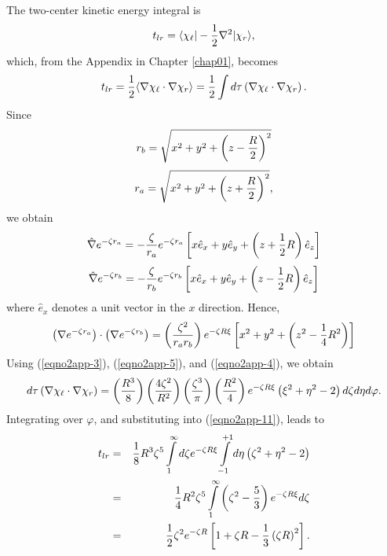 The two-center kinetic energy integral is
\begin{equation}
t_{lr} = \langle \chi_\ell \vert - {1 \over 2} \nabla^2 \vert 
\chi_r \rangle ,
\end{equation}
which, from the Appendix in Chapter \ref{chap01}, becomes
\begin{equation}
t_{lr} = {1 \over 2} \langle \nabla \chi_\ell \cdot \nabla \chi_r 
\rangle = {1 \over 2} \int d \tau \left( \nabla \chi_\ell \cdot \nabla 
\chi_r \right).
\label{eqno2app-11}
\end{equation}
Since
\begin{equation}
r_b = \sqrt{x^2 + y^2 + \left( z-{R \over 2} \right)^2}
\end{equation}
\begin{equation}
r_a = \sqrt{x^2 + y^2 + \left( z+{R \over 2} \right)^2} ,
\end{equation}
we obtain
\begin{equation}
{\hat \nabla} e^{- \zeta r_a} = - {\zeta \over r_a} e^{- \zeta r_a} 
\left[ x {\hat e}_x + y {\hat e}_y + \left( z + {1 \over 2} R 
\right) {\hat e}_z \right]
\end{equation}
\begin{equation}
{\hat \nabla} e^{- \zeta r_b} = - {\zeta \over r_b} e^{- \zeta r_b} 
\left[ x {\hat e}_x + y {\hat e}_y + \left( z - {1 \over 2} R 
\right) {\hat e}_z \right]
\end{equation}
where ${\hat e}_x$ denotes a unit vector in the $x$ direction. Hence,
\begin{equation}
\left( \nabla e^{- \zeta r_a} \right) \cdot \left( \nabla e^{- \zeta 
r_b} \right) = \left( {\zeta^2 \over r_ar_b} \right) e^{- \zeta R 
\xi} \left[ x^2 + y^2 + \left( z^2 - {1 \over 4} R^2 \right) \right]
\end{equation}
Using (\ref{eqno2app-3}), (\ref{eqno2app-5}), and (\ref{eqno2app-4}),
we obtain
\begin{equation}
d \tau \left( \nabla \chi_\ell \cdot \nabla \chi_r \right) = \left( {R^3 
\over 8} \right) \left( {4 \zeta^2 \over R^2} \right) \left( {\zeta^3 
\over \pi} \right) \left( {R^2 \over 4} \right) e^{- \zeta R \xi} 
\left( \xi^2 + \eta^2 - 2 \right) d \zeta d \eta d \varphi .
\end{equation}
Integrating over $\varphi$, and substituting into (\ref{eqno2app-11}),
leads to
\begin{eqnarray}
t_{lr} &=& {1 \over 8} R^3 \zeta^5 \int\limits^{\infty}_{1} d \zeta 
e^{- \zeta R \xi} \int\limits^{+1}_{-1} d \eta \left( \zeta^2 + 
\eta^2 - 2 \right)\cr
&=& {1 \over 4} R^2 \zeta^5 
\int\limits^{\infty}_{1} \left( \zeta^2 - {5 \over 3} \right) e^{- 
\zeta R \xi} d \zeta\cr
&=& {1 \over 2} \zeta^2 e^{- \zeta R} \left[ 1 + 
\zeta R - {1 \over 3} \left( \zeta R \right)^2 \right].
\end{eqnarray}

